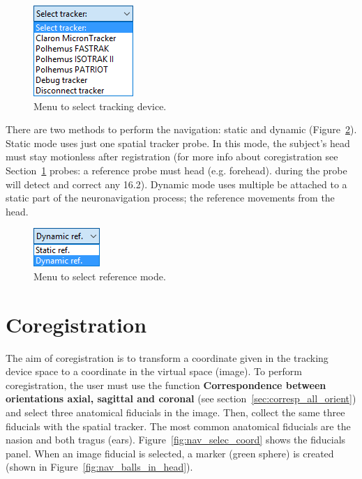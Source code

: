 \begin{figure}[!htb]
\centering
\includegraphics[scale=0.6]{../user_guide_figures/invesalius_screen/nav_select_tracker_en.png}
\caption{Menu to select tracking device.}
\label{fig:nav_select_tracker}
\end{figure}

There are two methods to perform the navigation: static and dynamic (Figure~\ref{fig:nav_menu_ref}). Static mode uses just one spatial tracker probe. In this mode, the subject's head must stay motionless after registration (for more info about coregistration see Section~\ref{sec:corregistro} probes: a reference probe must head (e.g. forehead). during the probe will detect and correct any 16.2). Dynamic mode uses multiple be attached to a static part of the neuronavigation process; the reference movements from the head.

\begin{figure}[!htb]
\centering
\includegraphics[scale=0.6]{../user_guide_figures/invesalius_screen/nav_menu_ref_en.png}
\caption{Menu to select reference mode.}
\label{fig:nav_menu_ref}
\end{figure}

\section{Coregistration}
\label{sec:corregistro}

The aim of coregistration is to transform a coordinate given in the tracking device space to a coordinate in the virtual space (image). To perform coregistration, the user must use the function \textbf{Correspondence between orientations axial, sagittal and coronal} (see section~\ref{sec:corresp_all_orient}) and select three anatomical fiducials in the image. Then, collect the same three fiducials with the spatial tracker. The most common anatomical fiducials are the nasion and both tragus (ears). Figure~\ref{fig:nav_selec_coord} shows the fiducials panel. When an image fiducial is selected, a marker (green sphere) is created (shown in Figure~\ref{fig:nav_balls_in_head}).

